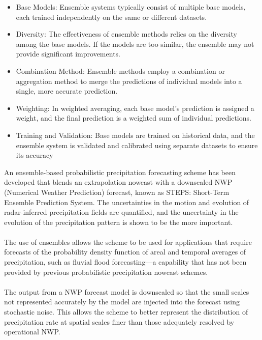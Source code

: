 \documentclass[../paper.tex]{subfiles}
\begin{document}
\begin{itemize}
    \item Base Models: Ensemble systems typically consist of multiple base models,
    each trained independently on the same or different datasets.

    \item Diversity: The effectiveness of ensemble methods relies on the diversity among the base models.
    If the models are too similar, the ensemble may not provide significant improvements.

    \item Combination Method:
    Ensemble methods employ a combination or aggregation method
    to merge the predictions of individual models into a single,
    more accurate prediction.

    \item Weighting: In weighted averaging, each base model's prediction is assigned a weight,
    and the final prediction is a weighted sum of individual predictions.

    \item Training and Validation: Base models are trained on historical data,
    and the ensemble system is validated and calibrated
    using separate datasets to ensure its accuracy
\end{itemize}

An ensemble-based probabilistic precipitation forecasting scheme has been developed that blends an extrapolation nowcast with a downscaled NWP
(Numerical Weather Prediction) forecast,
known as STEPS: Short-Term Ensemble Prediction System.
The uncertainties in the motion and evolution of radar-inferred precipitation fields are quantified,
and the uncertainty in the evolution of the precipitation pattern is shown to be the more important. \\\\
The use of ensembles allows the scheme
to be used for applications
that require forecasts of the probability density function of areal and temporal averages of precipitation,
such as fluvial flood forecasting—a capability
that has not been provided by previous probabilistic precipitation nowcast schemes. \\\\
The output from a NWP forecast model is downscaled
so that the small scales not represented accurately by the model are injected into the forecast
using stochastic noise.
This allows the scheme
to better represent the distribution of precipitation rate at spatial scales finer than those
adequately resolved by operational NWP\@.
\end{document}
